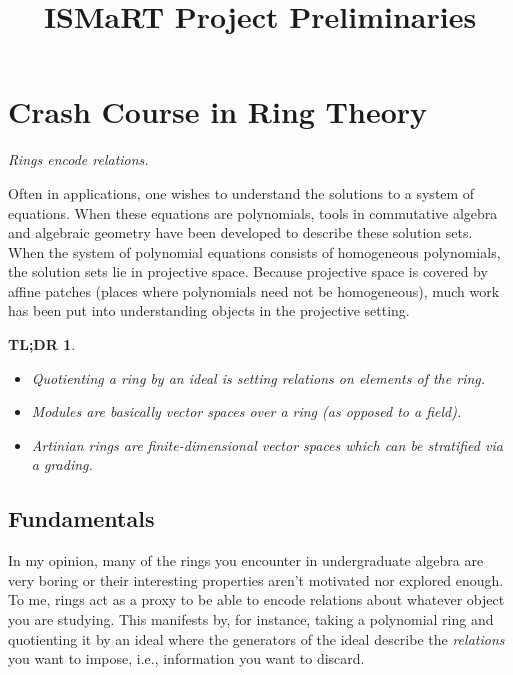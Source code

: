 \documentclass[12pt,a4paper]{article}
\title{ISMaRT Project Preliminaries}
\newtheorem*{tldr}{TL;DR}
\theoremstyle{definition}
\numberwithin{equation}{section}
\begin{document}
\author{}
\date{}

\maketitle

\tableofcontents

\newpage
\section{Crash Course in Ring Theory}
\noindent\textit{Rings encode relations.}

\vspace*{2.5cm}

\noindent Often in applications, one wishes to understand the solutions to a system of equations.
When these equations are polynomials, tools in commutative algebra and algebraic geometry have been developed to describe these solution sets.
When the system of polynomial equations consists of homogeneous polynomials, the solution sets lie in projective space. 
Because projective space is covered by affine patches (places where polynomials need not be homogeneous), much work has been put into understanding objects in the projective setting.

\vspace*{2.5cm}

\begin{tldr}
    \phantom{ }
    \begin{itemize}
        \item Quotienting a ring by an ideal is setting \emph{relations} on elements of the ring.

        \item Modules are basically vector spaces over a ring (as opposed to a field).

        \item Artinian rings are finite-dimensional vector spaces which can be stratified via a \emph{grading}.
    \end{itemize}
\end{tldr}

\vspace*{2.5cm}

\newpage

\subsection{Fundamentals}
In my opinion, many of the rings you encounter in undergraduate algebra are very boring or their interesting properties aren't motivated nor explored enough.
To me, rings act as a proxy to be able to encode relations about whatever object you are studying.
This manifests by, for instance, taking a polynomial ring and quotienting it by an ideal where the generators of the ideal describe the \emph{relations} you want to impose, i.e., information you want to discard.
\end{document}
